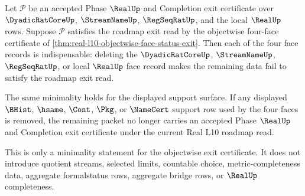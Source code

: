 \begin{theorem}
\label{thm:real-l10-exit-certificate-face-minimality}
Let $\mathcal P$ be an accepted Phase $\RealUp$ and Completion exit certificate over $\DyadicRatCoreUp$, $\StreamNameUp$, $\RegSeqRatUp$, and the local $\RealUp$ rows. Suppose $\mathcal P$ satisfies the roadmap exit read by the objectwise four-face certificate of \autoref{thm:real-l10-objectwise-face-status-exit}. Then each of the four face records is indispensable: deleting the $\DyadicRatCoreUp$, $\StreamNameUp$, $\RegSeqRatUp$, or local $\RealUp$ face record makes the remaining data fail to satisfy the roadmap exit read.

The same minimality holds for the displayed support surface. If any displayed $\BHist$, $\hsame$, $\Cont$, $\Pkg$, or $\NameCert$ support row used by the four faces is removed, the remaining packet no longer carries an accepted Phase $\RealUp$ and Completion exit certificate under the current Real L10 roadmap read.

This is only a minimality statement for the objectwise exit certificate. It does not introduce quotient streams, selected limits, countable choice, metric-completeness data, aggregate formalstatus rows, aggregate bridge rows, or $\RealUp$ completeness.
\end{theorem}
